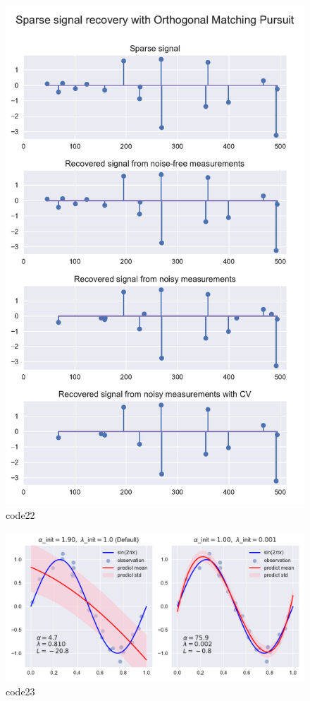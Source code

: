 \begin{figure}[htbp]
	\centering
	\includegraphics[width=14cm]{codeimage/code22}
	\caption{code22}
	\label{code22}
\end{figure}

\begin{PythonCode}\label{例16}
	
\end{PythonCode}

\begin{figure}[htbp]
	\centering
	\includegraphics[width=14cm]{codeimage/code23}
	\caption{code23}
	\label{code23}
\end{figure}

